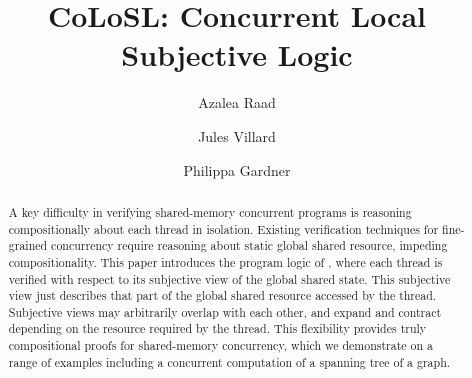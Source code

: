 \documentclass[runningheads,a4paper]{llncs}
\begin{document}
%
\title{CoLoSL: Concurrent Local Subjective Logic}
\author{Azalea Raad\and Jules Villard\and Philippa Gardner}

\maketitle

\begin{abstract}
A key difficulty in verifying shared-memory concurrent programs is
reasoning compositionally about each thread in isolation. Existing
verification techniques for fine-grained concurrency require 
reasoning about static global shared resource, impeding compositionality.  This
paper introduces the program logic of \colosl, where each thread is
verified with respect to its subjective view of the global
shared state.
This subjective view  just describes  that part of the global shared resource accessed by the
thread. Subjective views may arbitrarily overlap with each other, and
expand and contract depending on the resource required by the thread.
This flexibility provides truly compositional proofs for shared-memory
concurrency, which we demonstrate on a range of examples including a
concurrent computation of a spanning tree of a graph.
\end{abstract}

\allowdisplaybreaks
%
%
%
%
%
%
%


\appendix{

}
%
\end{document}
